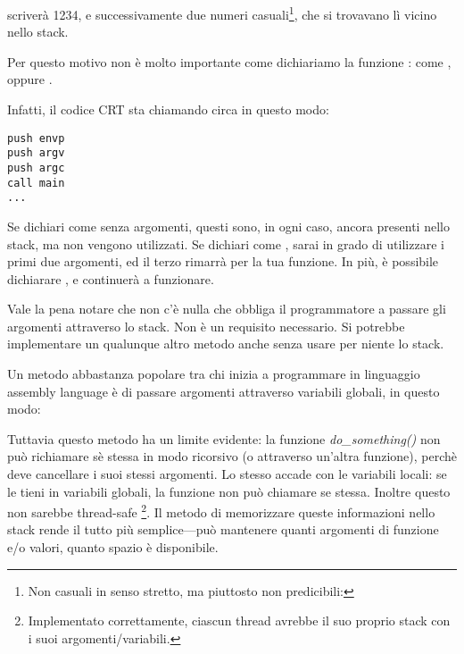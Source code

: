 \printf scriverà 1234, e successivamente due numeri casuali\footnote{Non casuali in senso stretto, ma piuttosto non predicibili: }, che si trovavano lì vicino nello stack.

\label{main_arguments}
\par
Per questo motivo non è molto importante come dichiariamo la funzione \main: come \main, \\
 oppure .

Infatti, il codice \ac{CRT} sta chiamando \main circa in questo modo:

\begin{lstlisting}[style=customasmx86]
push envp
push argv
push argc
call main
...
\end{lstlisting}

Se dichiari \main come \main senza argomenti, questi sono, in ogni caso, ancora presenti nello stack, ma non vengono utilizzati.
Se dichiari \main come ,
sarai in grado di utilizzare i primi due argomenti, ed il terzo rimarrà  per la tua funzione.
In più, è possibile dichiarare , e continuerà a funzionare.



Vale la pena notare che non c'è nulla che obbliga il programmatore a passare gli argomenti attraverso lo stack. Non è un requisito necessario.
Si potrebbe implementare un qualunque altro metodo anche senza usare per niente lo stack.

Un metodo abbastanza popolare tra chi inizia a programmare in linguaggio assembly language è di passare argomenti attraverso variabili globali, in questo modo:



Tuttavia questo metodo ha un limite evidente: la funzione \emph{do\_something()} non può richiamare sè stessa in modo ricorsivo (o attraverso un'altra funzione),
perchè deve cancellare i suoi stessi argomenti.
Lo stesso accade con le variabili locali: se le tieni in variabili globali, la funzione non può chiamare se stessa.
Inoltre questo non sarebbe thread-safe
\footnote{Implementato correttamente, ciascun thread avrebbe il suo proprio stack con i suoi argomenti/variabili.}.
Il metodo di memorizzare queste informazioni nello stack rende il tutto più semplice---può mantenere quanti argomenti di funzione e/o valori,
quanto spazio è disponibile.

